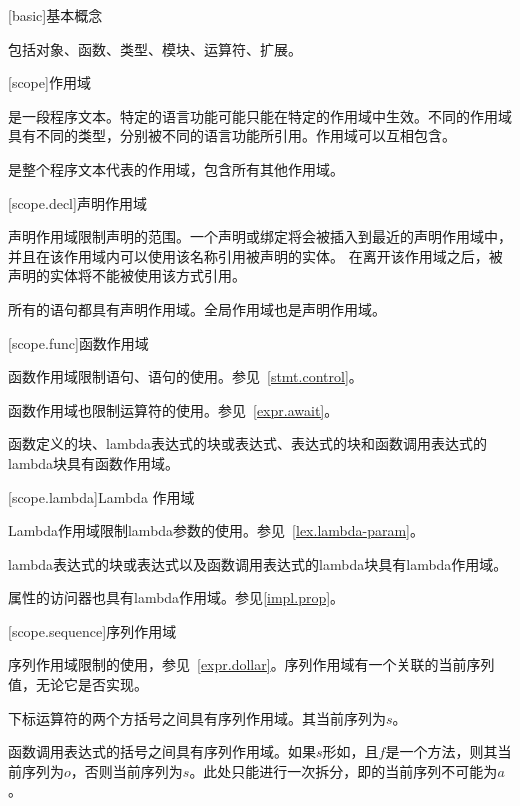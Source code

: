 
[basic]{基本概念}

\pnum
{}包括对象、函数、类型、模块、运算符、扩展。

[scope]{作用域}

\pnum
{}是一段程序文本。特定的语言功能可能只能在特定的作用域中生效。不同的作用域具有不同的类型，分别被不同的语言功能所引用。作用域可以互相包含。

\pnum
{}是整个程序文本代表的作用域，包含所有其他作用域。

[scope.decl]{声明作用域}

\pnum
声明作用域限制声明的范围。一个声明或绑定将会被插入到最近的声明作用域中，并且在该作用域内可以使用该名称引用被声明的实体。
在离开该作用域之后，被声明的实体将不能被使用该方式引用。

\pnum
所有的语句都具有声明作用域。全局作用域也是声明作用域。

[scope.func]{函数作用域}

\pnum
函数作用域限制语句、语句的使用。参见~\ref{stmt.control}。

\pnum
函数作用域也限制运算符的使用。参见~\ref{expr.await}。

\pnum
函数定义的块、lambda表达式的块或表达式、表达式的块和函数调用表达式的lambda块具有函数作用域。

[scope.lambda]{Lambda 作用域}

\pnum
Lambda作用域限制lambda参数的使用。参见~\ref{lex.lambda-param}。

\pnum
lambda表达式的块或表达式以及函数调用表达式的lambda块具有lambda作用域。

\pnum
属性的访问器也具有lambda作用域。参见\ref{impl.prop}。

[scope.sequence]{序列作用域}

\pnum
序列作用域限制\tcode{\$}的使用，参见~\ref{expr.dollar}。序列作用域有一个关联的当前序列值，无论它是否实现。

\pnum
下标运算符的两个方括号之间具有序列作用域。其当前序列为$s$。

\pnum
函数调用表达式的括号之间具有序列作用域。如果$s$形如，且$f$是一个方法，则其当前序列为$o$，否则当前序列为$s$。\enternote 此处只能进行一次拆分，即的当前序列不可能为$a$。\exitnote

